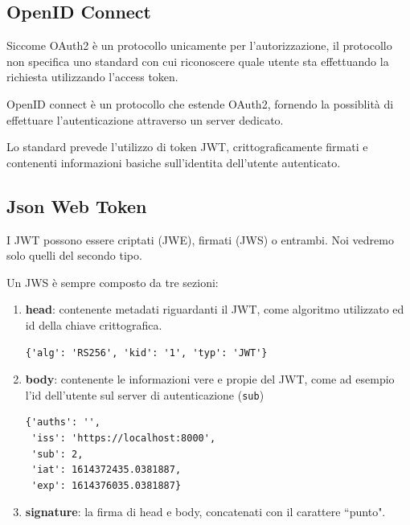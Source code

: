 \documentclass[11pt]{style}
\begin{document}
\subsection{OpenID Connect}
Siccome OAuth2 è un protocollo unicamente per l'autorizzazione, il protocollo
non specifica uno standard con cui riconoscere quale utente sta effettuando
la richiesta utilizzando l'access token.

OpenID connect è un protocollo che estende OAuth2, fornendo la
possiblità di effettuare l'autenticazione attraverso un server dedicato.

Lo standard prevede l'utilizzo di token JWT, crittograficamente firmati e contenenti
informazioni basiche sull'identita dell'utente autenticato.

\subsection{Json Web Token}
I JWT possono essere criptati (JWE), firmati (JWS) o entrambi.
Noi vedremo solo quelli del secondo tipo.

Un JWS è sempre composto da tre sezioni:
\begin{enumerate}
    \item \textbf{head}: contenente metadati riguardanti il JWT, come algoritmo
        utilizzato ed id della chiave crittografica.
\begin{lstlisting}
{'alg': 'RS256', 'kid': '1', 'typ': 'JWT'}
\end{lstlisting}
    \item \textbf{body}: contenente le informazioni vere e propie del JWT, come
        ad esempio l'id dell'utente sul server di autenticazione (\texttt{sub})
\begin{lstlisting}
{'auths': '',
 'iss': 'https://localhost:8000',
 'sub': 2,
 'iat': 1614372435.0381887,
 'exp': 1614376035.0381887}
 \end{lstlisting}
    \item \textbf{signature}: la firma di head e body, concatenati con il carattere ``punto".
\end{enumerate}
\end{document}
